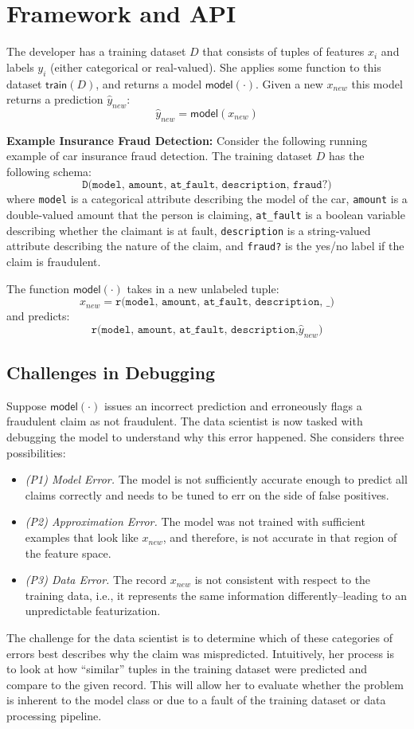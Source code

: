 \section{Framework and API}
The developer has a training dataset $D$ that consists of tuples of features $x_i$ and labels $y_i$ (either categorical or real-valued). She applies some function to this dataset $\textsf{train}(D)$, and returns a model $\textsf{model}(\cdot)$. Given a new $x_{new}$ this model returns a prediction $\hat{y}_{new}$:
\[
\hat{y}_{new} = \textsf{model}(x_{new})
\]

\vspace{0.5em}\noindent \textbf{Example Insurance Fraud Detection: } Consider the following running example of car insurance fraud detection. The training dataset $D$ has the following schema:
\[
\texttt{D(model, amount, at\_fault, description, fraud?)}
\]
where \texttt{model} is a categorical attribute describing the model of the car, \texttt{amount} is a double-valued amount that the person is claiming, \texttt{at\_fault} is a boolean variable describing whether the claimant is at fault, \texttt{description} is a string-valued attribute describing the nature of the claim, and \texttt{fraud?} is the yes/no label if the claim is fraudulent.

The function $\textsf{model}(\cdot)$ takes in a new unlabeled tuple:
\[
x_{new} = \texttt{r(model, amount, at\_fault, description, \_)}
\]
and predicts:
\[
\texttt{r(model, amount, at\_fault, description,} \hat{y}_{new} )
\]

\subsection{Challenges in Debugging}
Suppose $\textsf{model}(\cdot)$ issues an incorrect prediction and erroneously flags a fraudulent claim as not fraudulent. The data scientist is now tasked with debugging the model to understand why this error happened. 
She considers three possibilities: 
\begin{itemize}
\item \emph{(P1) Model Error.} The model is not sufficiently accurate enough to predict all claims correctly and needs to be tuned to err on the side of false positives.
\item \emph{(P2) Approximation Error.} The model was not trained with sufficient examples that look like $x_{new}$, and therefore, is not accurate in that region of the feature space.
\item \emph{(P3) Data Error.} The record $x_{new}$ is not consistent with respect to the training data, i.e., it represents the same information differently--leading to an unpredictable featurization.
\end{itemize}
The challenge for the data scientist is to determine which of these categories of errors best describes why the claim was mispredicted.
Intuitively, her process is to look at how ``similar'' tuples in the training dataset were predicted and compare to the given record. This will allow her to evaluate whether the problem is inherent to the model class or due to a fault of the training dataset or data processing pipeline. 

